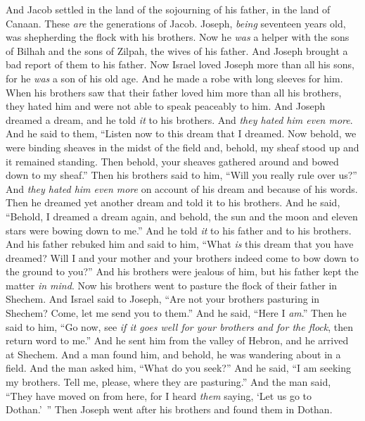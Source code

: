 \begin{biblechapter} %
 And Jacob settled in the land of the sojourning of his father, in the land of Canaan.
\verse These \textit{are} the generations of Jacob. Joseph, \textit{being} seventeen years old, was shepherding the flock with his brothers. Now he \textit{was} a helper with the sons of Bilhah and the sons of Zilpah, the wives of his father. And Joseph brought a bad report of them to his father.
\verse Now Israel loved Joseph more than all his sons, for he \textit{was} a son of his old age. And he made a robe with long sleeves for him.
\verse When his brothers saw that their father loved him more than all his brothers, they hated him and were not able to speak peaceably to him.
\verse And Joseph dreamed a dream, and he told \textit{it} to his brothers. And \textit{they hated him even more}.
\verse And he said to them, “Listen now to this dream that I dreamed.
\verse Now behold, we were binding sheaves in the midst of the field and, behold, my sheaf stood up and it remained standing. Then behold, your sheaves gathered around and bowed down to my sheaf.”
\verse Then his brothers said to him, “Will you really rule over us?” And \textit{they hated him even more} on account of his dream and because of his words.
\verse Then he dreamed yet another dream and told it to his brothers. And he said, “Behold, I dreamed a dream again, and behold, the sun and the moon and eleven stars were bowing down to me.”
\verse And he told \textit{it} to his father and to his brothers. And his father rebuked him and said to him, “What \textit{is} this dream that you have dreamed? Will I and your mother and your brothers indeed come to bow down to the ground to you?”
\verse And his brothers were jealous of him, but his father kept the matter \textit{in mind}.
 Now his brothers went to pasture the flock of their father in Shechem.
\verse And Israel said to Joseph, “Are not your brothers pasturing in Shechem? Come, let me send you to them.” And he said, “Here I \textit{am}.”
\verse Then he said to him, “Go now, see \textit{if it goes well for your brothers and for the flock}, then return word to me.” And he sent him from the valley of Hebron, and he arrived at Shechem.
\verse And a man found him, and behold, he was wandering about in a field. And the man asked him, “What do you seek?”
\verse And he said, “I am seeking my brothers. Tell me, please, where they are pasturing.”
\verse And the man said, “They have moved on from here, for I heard \textit{them} saying, ‘Let us go to Dothan.’ ” Then Joseph went after his brothers and found them in Dothan.

\end{biblechapter}
